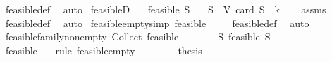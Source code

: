 \begin{isabellebody}
\ feasible{\isacharunderscore}{\kern0pt}def\ \isamarkupfalse%
\ auto%
\endisatagproof
{\isafoldproof}%
%
\isadelimproof
\isanewline
%
\endisadelimproof
\isanewline
{}\isamarkupfalse%
\ feasibleD{\isacharcolon}{\kern0pt}\isanewline
\ \ \ {\isachardoublequoteopen}feasible\ S{\isachardoublequoteclose}\isanewline
\ \ \ {\isachardoublequoteopen}S\ {\isasymsubseteq}\ V{\isachardoublequoteclose}\ {\isachardoublequoteopen}card\ S\ {\isasymle}\ k{\isachardoublequoteclose}\isanewline
%
\isadelimproof
\ \ %
\endisadelimproof
%
\isatagproof
{}\isamarkupfalse%
\ assms\ \isamarkupfalse%
\ feasible{\isacharunderscore}{\kern0pt}def\ \isamarkupfalse%
\ auto%
\endisatagproof
{\isafoldproof}%
%
\isadelimproof
\isanewline
%
\endisadelimproof
\isanewline
{}\isamarkupfalse%
\ feasible{\isacharunderscore}{\kern0pt}empty{\isacharbrackleft}{\kern0pt}simp{\isacharbrackright}{\kern0pt}{\isacharcolon}{\kern0pt}\ {\isachardoublequoteopen}feasible\ {\isacharbraceleft}{\kern0pt}{\isacharbraceright}{\kern0pt}{\isachardoublequoteclose}\isanewline
%
\isadelimproof
\ \ %
\endisadelimproof
%
\isatagproof
{}\isamarkupfalse%
\ feasible{\isacharunderscore}{\kern0pt}def\ \isamarkupfalse%
\ auto%
\endisatagproof
{\isafoldproof}%
%
\isadelimproof
\isanewline
%
\endisadelimproof
\isanewline
{}\isamarkupfalse%
\ feasible{\isacharunderscore}{\kern0pt}family{\isacharunderscore}{\kern0pt}nonempty{\isacharcolon}{\kern0pt}\ {\isachardoublequoteopen}Collect\ feasible\ {\isasymnoteq}\ {\isacharbraceleft}{\kern0pt}{\isacharbraceright}{\kern0pt}{\isachardoublequoteclose}\isanewline
%
\isadelimproof
%
\endisadelimproof
%
\isatagproof
{}\isamarkupfalse%
\ {\isacharminus}{\kern0pt}\isanewline
\ \ \isamarkupfalse%
\ {\isachardoublequoteopen}{\isasymexists}S{\isachardot}{\kern0pt}\ feasible\ S{\isachardoublequoteclose}\isanewline
\ \ \isamarkupfalse%
\isanewline
\ \ \ \ \isamarkupfalse%
\ {\isachardoublequoteopen}feasible\ {\isacharbraceleft}{\kern0pt}{\isacharbraceright}{\kern0pt}{\isachardoublequoteclose}\ \isamarkupfalse%
\ {\isacharparenleft}{\kern0pt}rule\ feasible{\isacharunderscore}{\kern0pt}empty{\isacharparenright}{\kern0pt}\isanewline
\ \ \isamarkupfalse%
\isanewline
\ \ \isamarkupfalse%
\ \isamarkupfalse%
\ {\isacharquery}{\kern0pt}thesis\ \isamarkupfalse%

\end{isabellebody}
